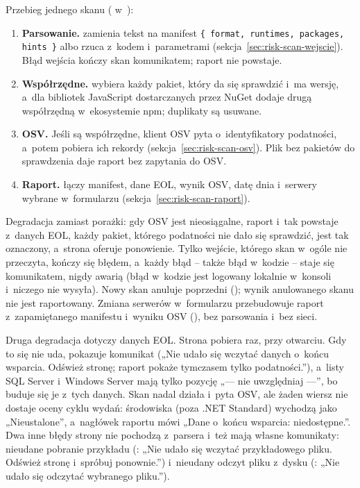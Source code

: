 Przebieg jednego skanu ( w~):

\begin{enumerate}
  \item \textbf{Parsowanie.}  zamienia tekst na manifest
        \texttt{\{ format, runtimes, packages, hints \}} albo rzuca 
        z~kodem i~parametrami (sekcja~\ref{sec:risk-scan-wejscie}). Błąd wejścia kończy skan
        komunikatem; raport nie powstaje.
  \item \textbf{Współrzędne.}  wybiera każdy pakiet, który da się
        sprawdzić i~ma wersję, a~dla bibliotek JavaScript dostarczanych przez NuGet dodaje
        drugą współrzędną w~ekosystemie npm; duplikaty są usuwane.
  \item \textbf{OSV.} Jeśli są współrzędne, klient OSV pyta o~identyfikatory podatności,
        a~potem pobiera ich rekordy (sekcja~\ref{sec:risk-scan-osv}). Plik bez pakietów do
        sprawdzenia daje raport bez zapytania do OSV.
  \item \textbf{Raport.}  łączy manifest, dane EOL, wynik OSV, datę
        dnia i~serwery wybrane w~formularzu (sekcja~\ref{sec:risk-scan-raport}).
\end{enumerate}

Degradacja zamiast porażki: gdy OSV jest nieosiągalne, raport i~tak powstaje z~danych EOL,
każdy pakiet, którego podatności nie dało się sprawdzić, jest tak oznaczony, a~strona
oferuje ponowienie. Tylko wejście, którego skan w~ogóle nie przeczyta, kończy się błędem,
a~każdy błąd -- także błąd w~kodzie -- staje się komunikatem, nigdy awarią (błąd w~kodzie jest
logowany lokalnie w~konsoli i~niczego nie wysyła). Nowy skan anuluje poprzedni
(); wynik anulowanego skanu nie jest raportowany. Zmiana serwerów
w~formularzu przebudowuje raport z~zapamiętanego manifestu i~wyniku OSV
(), bez parsowania i~bez sieci.

Druga degradacja dotyczy danych EOL. Strona pobiera  raz, przy
otwarciu. Gdy to się nie uda, pokazuje komunikat  („Nie
udało się wczytać danych o~końcu wsparcia. Odśwież stronę; raport pokaże tymczasem tylko
podatności.”), a~listy SQL Server i~Windows Server mają tylko pozycję „--- nie
uwzględniaj ---”, bo buduje się je z~tych danych. Skan nadal działa i~pyta OSV, ale żaden
wiersz nie dostaje oceny cyklu wydań: środowiska (poza .NET Standard) wychodzą jako
„Nieustalone”, a~nagłówek raportu mówi „Dane o~końcu wsparcia: niedostępne.”. Dwa inne
błędy strony nie pochodzą z~parsera i~też mają własne komunikaty: nieudane pobranie
przykładu (: „Nie udało się wczytać przykładowego pliku.
Odśwież stronę i~spróbuj ponownie.”) i~nieudany odczyt pliku z~dysku
(: „Nie udało się odczytać wybranego pliku.”).

